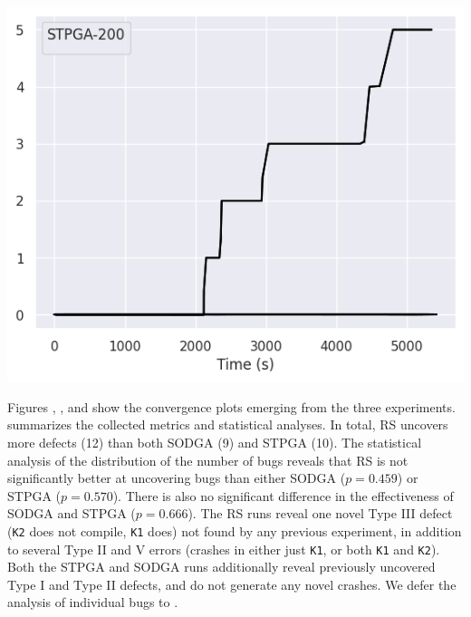 \begin{minipage}{\textwidth}
\begin{minipage}[b]{0.3\textwidth}
    \label{fig:rq2conv2}
\end{minipage}
  \hfill
  \begin{minipage}[b]{0.3\textwidth}
    \centering
    \includegraphics[scale=0.4]{img/rq2/rq2-conv3.png}
    \label{fig:rq2conv3}
\end{minipage}
\vspace{0.25cm}
\end{minipage}

Figures , , and 
show the convergence plots emerging from the three experiments.
 summarizes the collected metrics and statistical analyses.
In total, \Gls{RS} uncovers more defects (12)
than both \gls{SODGA} (9) and \gls{STPGA} (10).
The statistical analysis of the distribution of the number of bugs
reveals that \gls{RS} is not significantly better at uncovering bugs
than either \gls{SODGA} ($p=0.459$) or \gls{STPGA} ($p=0.570$).
There is also no significant difference in the effectiveness of
\gls{SODGA} and \gls{STPGA} ($p=0.666$).
The \gls{RS} runs reveal one novel Type III defect
(\texttt{K2} does not compile, \texttt{K1} does) not found by any previous experiment,
in addition to several Type II and V errors
(crashes in either just \texttt{K1}, or both \texttt{K1} and \texttt{K2}).
Both the \gls{STPGA} and \gls{SODGA} runs additionally reveal previously
uncovered Type I and Type II defects, and do not generate any novel crashes.
We defer the analysis of individual bugs to .

